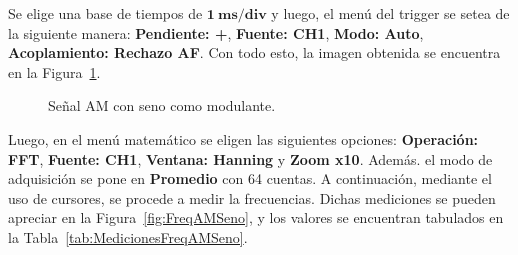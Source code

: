       
      Se elige una base de tiempos de $\mathbf{1~ms/div}$ y luego, el menú del trigger se setea de la siguiente manera:
      \textbf{Pendiente: +}, \textbf{Fuente: CH1}, \textbf{Modo: Auto}, \textbf{Acoplamiento: Rechazo AF}. Con
      todo esto, la imagen obtenida se encuentra en la Figura~\ref{fig:SeñalAM1EnTiempo}.
      
      \begin{figure}[H]
        \centering
        \caption{Señal AM con seno como modulante.}
        \label{fig:SeñalAM1EnTiempo}
      \end{figure}

      Luego, en el menú matemático se eligen las siguientes opciones: \textbf{Operación: FFT}, \textbf{Fuente: CH1}, \textbf{Ventana: Hanning} y
      \textbf{Zoom x10}. Además. el modo de adquisición se pone en \textbf{Promedio} con 64 cuentas. A continuación, mediante el uso de 
      cursores, se procede a medir la frecuencias. Dichas mediciones se pueden apreciar en la Figura~\ref{fig:FreqAMSeno}, y los valores 
      se encuentran tabulados en la Tabla~\ref{tab:MedicionesFreqAMSeno}.

